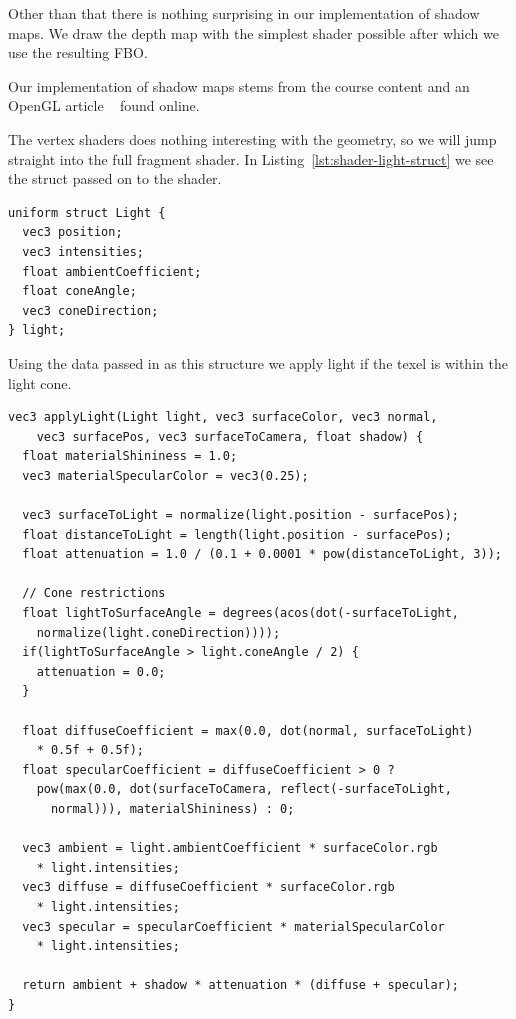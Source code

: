 \documentclass[a4paper,12pt]{article}
\begin{document}
Other than that there is nothing surprising in our implementation of shadow maps. We draw the depth map with the simplest shader possible after which we use the resulting FBO.

Our implementation of shadow maps stems from the course content and an OpenGL article ~\cite{shadow-maps-tutorial} found online.

The vertex shaders does nothing interesting with the geometry, so we will jump straight into the full fragment shader. In Listing~\ref{lst:shader-light-struct} we see the struct passed on to the shader.

\begin{lstlisting}[label=lst:shader-light-struct,caption= The light struct received in the shader.]
uniform struct Light {
  vec3 position;
  vec3 intensities;
  float ambientCoefficient;
  float coneAngle;
  vec3 coneDirection;
} light;
\end{lstlisting}

Using the data passed in as this structure we apply light if the texel is within the light cone.

\begin{lstlisting}[label=lst:applyLight,caption= Shader function for applying lighting]
vec3 applyLight(Light light, vec3 surfaceColor, vec3 normal,
    vec3 surfacePos, vec3 surfaceToCamera, float shadow) {
  float materialShininess = 1.0;
  vec3 materialSpecularColor = vec3(0.25);

  vec3 surfaceToLight = normalize(light.position - surfacePos);
  float distanceToLight = length(light.position - surfacePos);
  float attenuation = 1.0 / (0.1 + 0.0001 * pow(distanceToLight, 3));

  // Cone restrictions
  float lightToSurfaceAngle = degrees(acos(dot(-surfaceToLight,
    normalize(light.coneDirection))));
  if(lightToSurfaceAngle > light.coneAngle / 2) {
    attenuation = 0.0;
  }

  float diffuseCoefficient = max(0.0, dot(normal, surfaceToLight)
    * 0.5f + 0.5f);
  float specularCoefficient = diffuseCoefficient > 0 ?
    pow(max(0.0, dot(surfaceToCamera, reflect(-surfaceToLight,
      normal))), materialShininess) : 0;

  vec3 ambient = light.ambientCoefficient * surfaceColor.rgb
    * light.intensities;
  vec3 diffuse = diffuseCoefficient * surfaceColor.rgb
    * light.intensities;
  vec3 specular = specularCoefficient * materialSpecularColor
    * light.intensities;

  return ambient + shadow * attenuation * (diffuse + specular);
}
\end{lstlisting}
\end{document}
